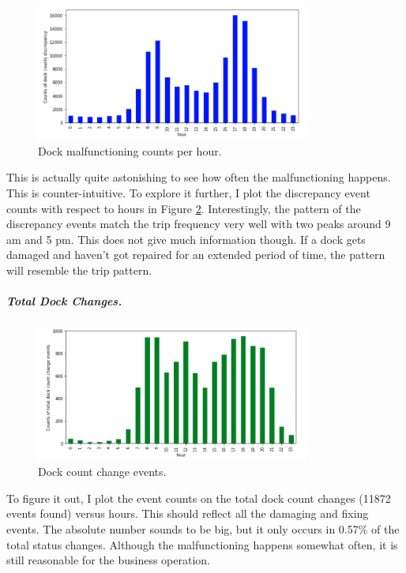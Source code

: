 \documentclass[a4paper]{article}
\begin{document}
				\begin{figure}
					\centering
					\includegraphics[width=0.8\textwidth]{LessDocksCount.png}
					\caption{\label{fig:less_docks}Dock malfunctioning counts per hour.}
				\end{figure}			
				
				This is actually quite astonishing to see how often the malfunctioning happens.	This is counter-intuitive. To explore it further, I plot the discrepancy event counts with respect to hours in Figure \ref{fig:less_docks}. Interestingly, the pattern of the discrepancy events match the trip frequency very well with two peaks around 9 am and 5 pm. This does not give much information though. If a dock gets damaged and haven't got repaired for an extended period of time, the pattern will resemble the trip pattern. 		
				
				\subparagraph{Total Dock Changes.}				
				
				\begin{figure}
					\centering
					\includegraphics[width=0.8\textwidth]{DockChangeCounts.png}
					\caption{\label{fig:less_docks}Dock count change events.}
				\end{figure}			
				
				To figure it out, I plot the event counts on the total dock count changes (11872 events found) versus hours. This should reflect all the damaging and fixing events. The absolute number sounds to be big, but it only occurs in 0.57\% of the total status changes. Although the malfunctioning happens somewhat often, it is still reasonable for the business operation.			
\end{document}
